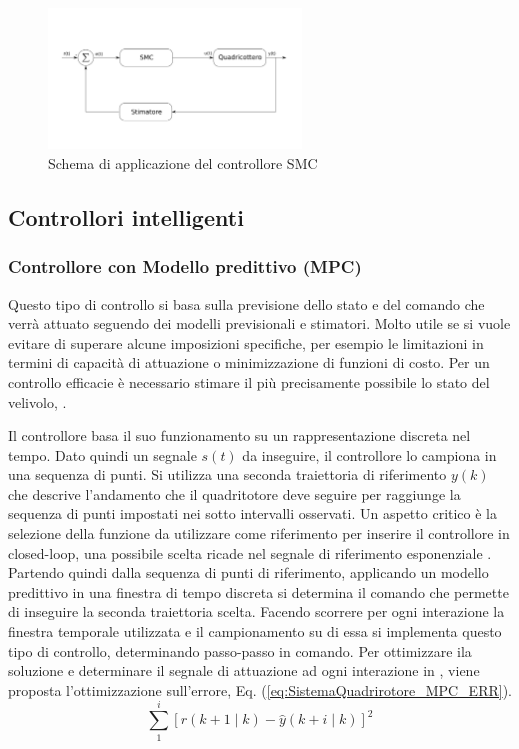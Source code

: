 \begin{figure}
	\centering
	\includegraphics[width=0.6\textwidth]{SistemaQuadrirotore/Figure/SMC}
	\caption{Schema di applicazione del controllore SMC}
\end{figure}

\subsection{Controllori intelligenti}

\subsubsection{Controllore con Modello predittivo (MPC)}

Questo tipo di controllo si basa sulla previsione dello stato e del comando che verrà attuato seguendo dei modelli previsionali e stimatori. Molto utile se si vuole evitare di superare alcune imposizioni specifiche, per esempio le limitazioni in termini di capacità di attuazione o minimizzazione di funzioni di costo.
Per un controllo efficacie è necessario stimare il più precisamente possibile lo stato del velivolo, \cite{KimJinho2020ACSo}.


Il controllore basa il suo funzionamento su un rappresentazione discreta nel tempo. Dato quindi un segnale $s(t)$ da inseguire, il controllore lo campiona in una sequenza di punti. Si utilizza una seconda traiettoria di riferimento $y(k)$ che descrive l'andamento che il quadritotore deve seguire per raggiunge la sequenza di punti impostati nei sotto intervalli osservati. Un aspetto critico è la selezione della funzione da utilizzare come riferimento per inserire il controllore in closed-loop, una possibile scelta ricade nel segnale di riferimento esponenziale \cite{AbdolhosseiniM2013AEMP}. Partendo quindi dalla sequenza di punti di riferimento, applicando un modello predittivo in una finestra di tempo discreta si determina il comando che permette di inseguire la seconda traiettoria scelta. Facendo scorrere per ogni interazione la finestra temporale utilizzata e il campionamento su di essa si implementa questo tipo di controllo, determinando passo-passo in comando.
Per ottimizzare ila soluzione e determinare il segnale di attuazione ad ogni interazione in \cite{AbdolhosseiniM2013AEMP}, viene proposta l'ottimizzazione sull'errore, Eq. (\ref{eq:SistemaQuadrirotore_MPC_ERR}).
\begin{equation}\label{eq:SistemaQuadrirotore_MPC_ERR}
	\sum_{1}^{i} \left[r(k+1 \mid k) - \hat{y}(k+i \mid k)\right]^2
\end{equation}

